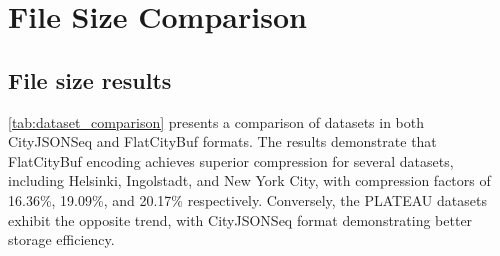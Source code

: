 \section{File Size Comparison}
\label{result:file_size_comparison}

\subsection{File size results}
\label{result:overview:filesize_comparison}

\autoref{tab:dataset_comparison} presents a comparison of datasets in both CityJSONSeq and FlatCityBuf formats. The results demonstrate that FlatCityBuf encoding achieves superior compression for several datasets, including Helsinki, Ingolstadt, and New York City, with compression factors of 16.36\%, 19.09\%, and 20.17\% respectively. Conversely, the PLATEAU datasets exhibit the opposite trend, with CityJSONSeq format demonstrating better storage efficiency.

